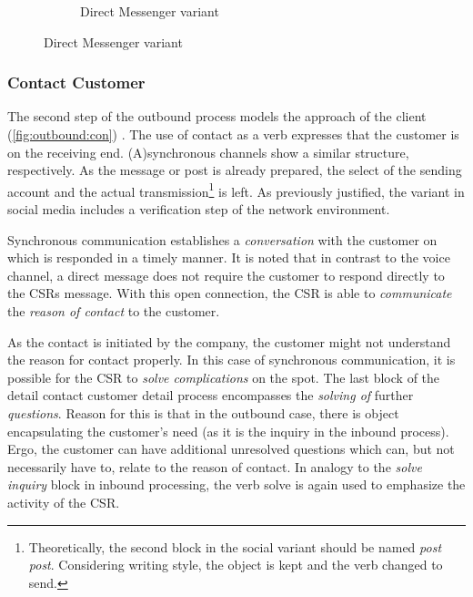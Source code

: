 \begin{figure}[caption={Prepare contact detail process}, label={fig:outbound:prep}]
\begin{subfigure}[b]{.45\textwidth}
\begin{tikzpicture}
				\end{tikzpicture}
				\caption{Direct Messenger variant}\label{fig:outbound:prep:dm}
			\end{subfigure}
		\end{figure}
	
	
		\subsubsection{Contact Customer}
		
		The second step of the outbound process models the approach of the client (\Fig \ref{fig:outbound:con}) . The use of contact as a verb expresses that the customer is on the receiving end. (A)synchronous channels show a similar structure, respectively. As the message or post is already prepared, the select of the sending account and the actual transmission\footnote{Theoretically, the second block in the social variant should be named \textit{post post}. Considering writing style, the object is kept and the verb changed to send. } is left. As previously justified, the variant in social media includes a verification step of the network environment. 
		
		Synchronous communication establishes a \textit{conversation} with the customer on which is responded in a timely manner. It is noted that in contrast to the voice channel, a direct message does not require the customer to respond directly to the \acrshort{CSR}s message. With this open connection, the  \acrshort{CSR} is able to \textit{communicate} the \textit{reason of contact} to the customer. 
		
		As the contact is initiated by the company, the customer might not understand the reason for contact properly. In this case of synchronous communication, it is possible for the \acrshort{CSR} to\textit{ solve complications} on the spot. The last block of the detail contact customer detail process encompasses the \textit{solving of }further \textit{questions}. Reason for this is that in the outbound case, there is object encapsulating the customer's need (as it is the inquiry in the inbound process). Ergo, the customer can have additional unresolved questions which can, but not necessarily have to, relate to the reason of contact. In analogy to the \textit{solve inquiry} block in inbound processing, the verb solve is again used to emphasize the activity of the  \acrshort{CSR}. 
		
